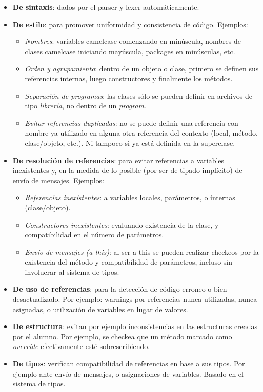 \begin{itemize}
  \item \textbf{De sintaxis}: dados por el parser y lexer automáticamente.
  \item \textbf{De estilo}: para promover uniformidad y consistencia de código.
  Ejemplos:
  		\begin{itemize}
  			\item \textit{Nombres}: variables camelcase comenzando en minúscula,
  			nombres de clases camelcase iniciando mayúscula, packages en minúsculas, etc.
  			\item \textit{Orden y agrupamiento}: dentro de un objeto o clase, primero
  			se definen sus referencias internas, luego constructores y finalmente los métodos.
  			\item \textit{Separación de programas}: las clases sólo se pueden definir
  			en archivos de tipo \textit{librería}, no dentro de un \textit{program}.
  			\item \textit{Evitar referencias duplicadas}: no se puede definir una
  			referencia con nombre ya utilizado en alguna otra referencia del contexto (local, método,
  			clase/objeto, etc.). Ni tampoco si ya está definida en la superclase.
		\end{itemize}
  \item \textbf{De resolución de referencias}: para evitar referencias a
  variables inexistentes y, en la medida de lo posible (por ser de tipado
  implícito) de envío de mensajes. Ejemplos:
  		\begin{itemize}
		  \item \textit{Referencias inexistentes}: a variables locales, parámetros, o
		  internas (clase/objeto).
		  \item \textit{Constructores inexistentes}: evaluando existencia de la
		  clase, y compatibilidad en el número de paråmetros.
		  \item \textit{Envío de mensajes (a this)}: al ser a this se pueden realizar
		  checkeos por la existencia del método y compatibilidad de parámetros, incluso sin
		  involucrar al sistema de tipos.
		\end{itemize}
  \item \textbf{De uso de referencias}: para la detección de código
  	erroneo o bien desactualizado. Por ejemplo: warnings por referencias nunca
 	utilizadas, nunca asignadas, o utilización de variables en lugar de valores.
  \item \textbf{De estructura}: evitan por ejemplo inconsistencias en las
  estructuras creadas por el alumno. Por ejemplo, se checkea
  que un método marcado como \textit{override} efectivamente esté
  sobrescribiendo.
  \item \textbf{De tipos}: verifican compatibilidad de referencias en base a sus
  tipos. Por ejemplo ante envío de mensajes, o asignaciones de variables. Basado
  en el sistema de tipos.
\end{itemize}


